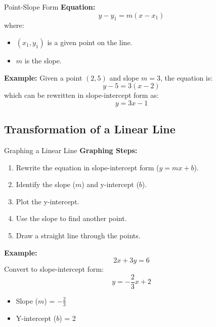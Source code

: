 \documentclass{beamer}
\begin{document}
\begin{frame}{Point-Slope Form}
    \textbf{Equation:}
    \[
    y - y_1 = m(x - x_1)
    \]
    where:
    \begin{itemize}
        \item \( (x_1, y_1) \) is a given point on the line.
        \item \( m \) is the slope.
    \end{itemize}

    \vspace{0.5cm}
    \textbf{Example:} Given a point \( (2, 5) \) and slope \( m = 3 \), the equation is:
    \[
    y - 5 = 3(x - 2)
    \]
    which can be rewritten in slope-intercept form as:
    \[
    y = 3x - 1
    \]
\end{frame}
\begin{frame}
\section{Transformation of a Linear Line}
\end{frame}
\begin{frame}{Graphing a Linear Line}
    \textbf{Graphing Steps:}
    \begin{enumerate}
        \item Rewrite the equation in slope-intercept form (\( y = mx + b \)).
        \item Identify the slope (\( m \)) and y-intercept (\( b \)).
        \item Plot the y-intercept.
        \item Use the slope to find another point.
        \item Draw a straight line through the points.
    \end{enumerate}

    \vspace{0.5cm}
    \textbf{Example:}
    \[
    2x + 3y = 6
    \]
    Convert to slope-intercept form:
    \[
    y = -\frac{2}{3}x + 2
    \]
    \begin{itemize}
        \item Slope (\( m \)) = \( -\frac{2}{3} \)
        \item Y-intercept (\( b \)) = 2
    \end{itemize}
\end{frame}
\end{document}
